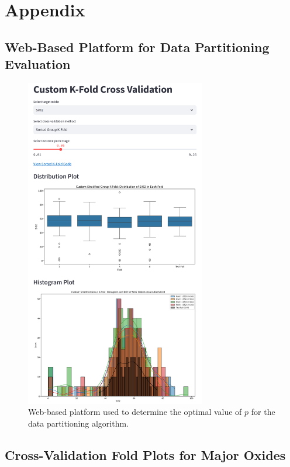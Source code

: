 \onecolumn
\section*{Appendix}

\subsection{Web-Based Platform for Data Partitioning Evaluation}\label{subsec:web_platform}

\begin{figure}
    \centering
    \includegraphics[width=0.7\textwidth]{images/web_platform.png}
    \caption{Web-based platform used to determine the optimal value of $p$ for the data partitioning algorithm.}
    \label{fig:web_platform}
\end{figure}

\FloatBarrier

\subsection{Cross-Validation Fold Plots for Major Oxides}\label{subsec:cv_plots}

